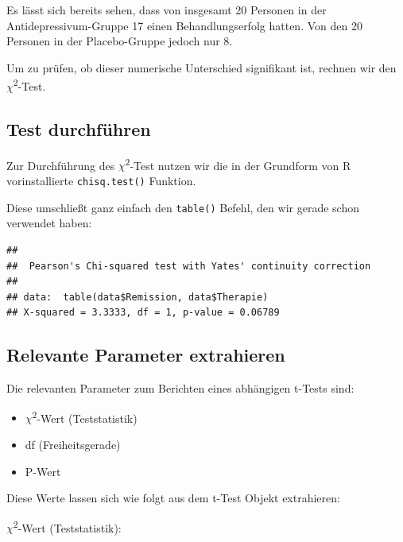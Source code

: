 \documentclass[
]{book}
\newenvironment{Shaded}{\begin{snugshade}}{\end{snugshade}}
\newcommand{\FunctionTok}[1]{\textcolor[rgb]{0.13,0.29,0.53}{\textbf{#1}}}
\newcommand{\NormalTok}[1]{#1}
\newcommand{\SpecialCharTok}[1]{\textcolor[rgb]{0.81,0.36,0.00}{\textbf{#1}}}
\providecommand{\tightlist}{%
  \setlength{\itemsep}{0pt}\setlength{\parskip}{0pt}}
\begin{document}
Es lässt sich bereits sehen, dass von insgesamt 20 Personen in der Antidepressivum-Gruppe 17 einen Behandlungserfolg hatten. Von den 20 Personen in der Placebo-Gruppe jedoch nur 8.

Um zu prüfen, ob dieser numerische Unterschied signifikant ist, rechnen wir den \(\chi\)\textsuperscript{2}-Test.

\subsection{Test durchführen}\label{test-durchfuxfchren-5}

Zur Durchführung des \(\chi\)\textsuperscript{2}-Test nutzen wir die in der Grundform von R vorinstallierte \texttt{chisq.test()} Funktion.

Diese umschließt ganz einfach den \texttt{table()} Befehl, den wir gerade schon verwendet haben:

\begin{Shaded}
\end{Shaded}

\begin{verbatim}
## 
##  Pearson's Chi-squared test with Yates' continuity correction
## 
## data:  table(data$Remission, data$Therapie)
## X-squared = 3.3333, df = 1, p-value = 0.06789
\end{verbatim}

\subsection{Relevante Parameter extrahieren}\label{relevante-parameter-extrahieren-4}

Die relevanten Parameter zum Berichten eines abhängigen t-Tests sind:

\begin{itemize}
\tightlist
\item
  \(\chi\)\textsuperscript{2}-Wert (Teststatistik)
\item
  df (Freiheitsgerade)
\item
  P-Wert
\end{itemize}

Diese Werte lassen sich wie folgt aus dem t-Test Objekt extrahieren:

\(\chi\)\textsuperscript{2}-Wert (Teststatistik):
\end{document}
